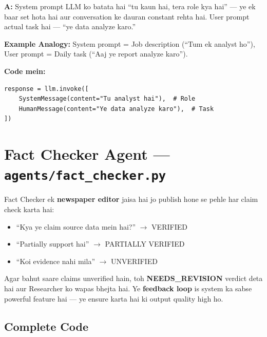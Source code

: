 \documentclass[12pt, a4paper]{article}
\begin{document}
\begin{interviewbox}[title={\faIcon{user-tie} ~Q: System Prompt vs User Prompt mein kya fark hai?}]
\textbf{A:} System prompt LLM ko batata hai ``tu kaun hai, tera role kya hai'' --- ye ek baar set hota hai aur conversation ke dauran constant rehta hai. User prompt actual task hai --- ``ye data analyze karo.''

\textbf{Example Analogy:} System prompt = Job description (``Tum ek analyst ho''), User prompt = Daily task (``Aaj ye report analyze karo'').

\textbf{Code mein:}
\begin{lstlisting}[style=pythonstyle]
response = llm.invoke([
    SystemMessage(content="Tu analyst hai"),  # Role
    HumanMessage(content="Ye data analyze karo"),  # Task
])
\end{lstlisting}
\end{interviewbox}


\newpage
\section{Fact Checker Agent --- \texttt{agents/fact\_checker.py}}

\begin{storybox}
Fact Checker ek \textbf{newspaper editor} jaisa hai jo publish hone se pehle har claim check karta hai:
\begin{itemize}
\item ``Kya ye claim source data mein hai?'' $\rightarrow$ VERIFIED
\item ``Partially support hai'' $\rightarrow$ PARTIALLY VERIFIED
\item ``Koi evidence nahi mila'' $\rightarrow$ UNVERIFIED
\end{itemize}
Agar bahut saare claims unverified hain, toh \textbf{NEEDS\_REVISION} verdict deta hai aur Researcher ko wapas bhejta hai. Ye \textbf{feedback loop} is system ka sabse powerful feature hai --- ye ensure karta hai ki output quality high ho.
\end{storybox}

\subsection{Complete Code}
\end{document}
